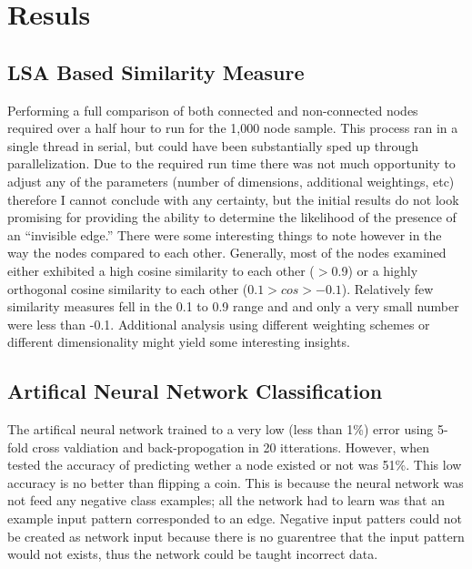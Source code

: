 \section{Resuls}
\label{sec:Results}

\subsection{LSA Based Similarity Measure}
Performing a full comparison of both connected and non-connected nodes required over a half hour to run for the 1,000 node sample.  This process ran in a single thread in serial, but could have been substantially sped up through parallelization.  Due to the required run time there was not much opportunity to adjust any of the parameters (number of dimensions, additional weightings, etc) therefore I cannot conclude with any certainty, but the initial results do not look promising for providing the ability to determine the likelihood of the presence of an “invisible edge.” There were some interesting things to note however in the way the nodes compared to each other.  Generally, most of the nodes examined either exhibited a high cosine similarity to each other ($>$0.9) or a highly orthogonal cosine similarity to each other ($0.1 > cos >-0.1$).  Relatively few similarity measures fell in the 0.1 to 0.9 range and and only a very small number were less than -0.1.  Additional analysis using different weighting schemes or different dimensionality might yield some interesting insights.
\subsection{Artifical Neural Network Classification}

The artifical neural network trained to a very low (less than 1\%) error using 5-fold cross valdiation and back-propogation in 20 itterations. 
However, when tested the accuracy of predicting wether a node existed or not was 51\%.  This low accuracy is no better than flipping a coin.
This is because the neural network was not feed any negative class examples; all the network had to learn was that an example input pattern corresponded to an edge.
Negative input patters could not be created as network input because there is no guarentree that the input pattern would not exists, thus the network could be taught incorrect data.

